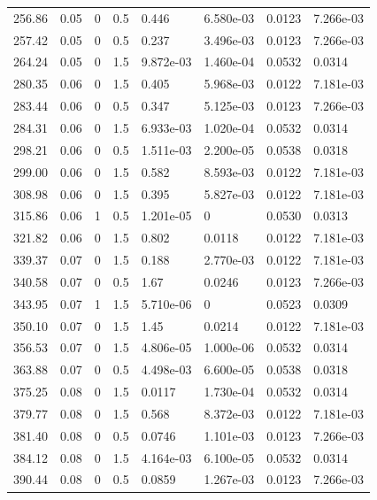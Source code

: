 \documentclass[preview]{standalone}
\begin{document}
{{{\begin{tabular}{L{1.2cm}C{1.2cm} C{0.3cm}C{0.5cm} C{1.4cm}C{1.4cm} C{1.4cm}C{1.4cm}}
  256.86  &  0.05  & 0     & 0.5 &  0.446  & 6.580e-03  & 0.0123 &  7.266e-03   \\ 
  257.42  &  0.05  & 0     & 0.5 &  0.237  & 3.496e-03  & 0.0123 &  7.266e-03   \\ 
  264.24  &  0.05  & 0     & 1.5 &  9.872e-03  & 1.460e-04  & 0.0532 &  0.0314   \\ 
  280.35  &  0.06  & 0     & 1.5 &  0.405  & 5.968e-03  & 0.0122 &  7.181e-03   \\ 
  283.44  &  0.06  & 0     & 0.5 &  0.347  & 5.125e-03  & 0.0123 &  7.266e-03   \\ 
  284.31  &  0.06  & 0     & 1.5 &  6.933e-03  & 1.020e-04  & 0.0532 &  0.0314   \\ 
  298.21  &  0.06  & 0     & 0.5 &  1.511e-03  & 2.200e-05  & 0.0538 &  0.0318   \\ 
  299.00  &  0.06  & 0     & 1.5 &  0.582  & 8.593e-03  & 0.0122 &  7.181e-03   \\ 
  308.98  &  0.06  & 0     & 1.5 &  0.395  & 5.827e-03  & 0.0122 &  7.181e-03   \\ 
  315.86  &  0.06  & 1     & 0.5 &  1.201e-05  & 0  & 0.0530 &  0.0313   \\ 
  321.82  &  0.06  & 0     & 1.5 &  0.802  & 0.0118  & 0.0122 &  7.181e-03   \\ 
  339.37  &  0.07  & 0     & 1.5 &  0.188  & 2.770e-03  & 0.0122 &  7.181e-03   \\ 
  340.58  &  0.07  & 0     & 0.5 &  1.67  & 0.0246  & 0.0123 &  7.266e-03   \\ 
  343.95  &  0.07  & 1     & 1.5 &  5.710e-06  & 0  & 0.0523 &  0.0309   \\ 
  350.10  &  0.07  & 0     & 1.5 &  1.45  & 0.0214  & 0.0122 &  7.181e-03   \\ 
  356.53  &  0.07  & 0     & 1.5 &  4.806e-05  & 1.000e-06  & 0.0532 &  0.0314   \\ 
  363.88  &  0.07  & 0     & 0.5 &  4.498e-03  & 6.600e-05  & 0.0538 &  0.0318   \\ 
  375.25  &  0.08  & 0     & 1.5 &  0.0117  & 1.730e-04  & 0.0532 &  0.0314   \\ 
  379.77  &  0.08  & 0     & 1.5 &  0.568  & 8.372e-03  & 0.0122 &  7.181e-03   \\ 
  381.40  &  0.08  & 0     & 0.5 &  0.0746  & 1.101e-03  & 0.0123 &  7.266e-03   \\ 
  384.12  &  0.08  & 0     & 1.5 &  4.164e-03  & 6.100e-05  & 0.0532 &  0.0314   \\ 
  390.44  &  0.08  & 0     & 0.5 &  0.0859  & 1.267e-03  & 0.0123 &  7.266e-03   \\ 

\end{tabular}}}}
\end{document}
